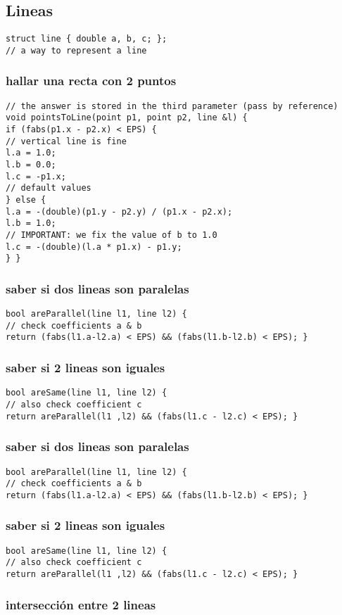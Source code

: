 \subsection{Lineas}
\begin{lstlisting}[style=C]
struct line { double a, b, c; };
// a way to represent a line
\end{lstlisting}
\subsubsection{hallar una recta con 2 puntos}
\begin{lstlisting}[style=C]
// the answer is stored in the third parameter (pass by reference)
void pointsToLine(point p1, point p2, line &l) {
if (fabs(p1.x - p2.x) < EPS) {
// vertical line is fine
l.a = 1.0;
l.b = 0.0;
l.c = -p1.x;
// default values
} else {
l.a = -(double)(p1.y - p2.y) / (p1.x - p2.x);
l.b = 1.0;
// IMPORTANT: we fix the value of b to 1.0
l.c = -(double)(l.a * p1.x) - p1.y;
} }
\end{lstlisting}
\subsubsection{saber si dos lineas son paralelas}
\begin{lstlisting}[style=C]
bool areParallel(line l1, line l2) {
// check coefficients a & b
return (fabs(l1.a-l2.a) < EPS) && (fabs(l1.b-l2.b) < EPS); }
\end{lstlisting}
\subsubsection{saber si 2 lineas son iguales}
\begin{lstlisting}[style=C]
bool areSame(line l1, line l2) {
// also check coefficient c
return areParallel(l1 ,l2) && (fabs(l1.c - l2.c) < EPS); }
\end{lstlisting}
\subsubsection{saber si dos lineas son paralelas}
\begin{lstlisting}[style=C]
bool areParallel(line l1, line l2) {
// check coefficients a & b
return (fabs(l1.a-l2.a) < EPS) && (fabs(l1.b-l2.b) < EPS); }
\end{lstlisting}
\subsubsection{saber si 2 lineas son iguales}
\begin{lstlisting}[style=C]
bool areSame(line l1, line l2) {
// also check coefficient c
return areParallel(l1 ,l2) && (fabs(l1.c - l2.c) < EPS); }
\end{lstlisting}
\subsubsection{intersección entre 2 lineas}
